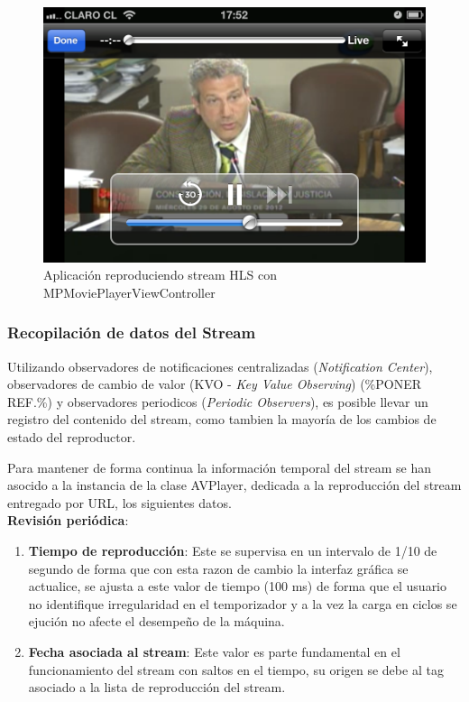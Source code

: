 \begin{figure}[H]
	\centering
	\includegraphics[scale=0.3]{imgs/mpmpvc-example.png}
	\caption{Aplicación reproduciendo stream HLS con MPMoviePlayerViewController}
	\label{IMG-mpmpvc-example}	
\end{figure}

		\subsubsection{Recopilación de datos del Stream}
Utilizando observadores de notificaciones centralizadas (\textit{Notification Center}), observadores de cambio de valor (KVO - \textit{Key Value Observing}) (\%PONER REF.\%) y observadores periodicos (\textit{Periodic Observers}), es posible llevar un registro del contenido del stream, como tambien la mayoría de los cambios de estado del reproductor.

Para mantener de forma continua la información temporal del stream se han asocido a la instancia de la clase AVPlayer, dedicada a la reproducción del stream entregado por URL, los siguientes datos.\\

\textbf{Revisión periódica}:

\begin{enumerate}
\item \textbf{Tiempo de reproducción}: Este se supervisa en un intervalo de 1/10 de segundo de forma que con esta razon de cambio la interfaz gráfica se actualice, se ajusta a  este valor de tiempo (100 ms) de forma que el usuario no identifique irregularidad en el temporizador y a la vez la carga en ciclos se ejución no afecte el desempeño de la máquina.
\item \textbf{Fecha asociada al stream}: Este valor es parte fundamental en el funcionamiento del stream con saltos en el tiempo, su origen se debe al tag asociado a la lista de reproducción del stream.
\label{observer-date}

\end{enumerate}

